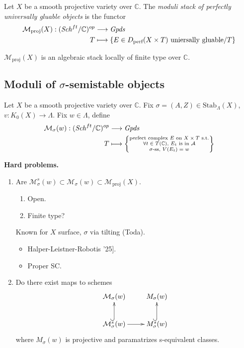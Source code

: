 \begin{definition}
\label{definition-moduli-stack-of-perfectly-univerasally-gluable-objects}
Let $X$ be a smooth projective variety over $\mathbb{C}$. The {\it moduli stack
of perfectly universally gluable objects} is the functor
\begin{align*}
\mathcal{M}_{\text{proj}}(X): (\mathit{Sch}^{ft}/\mathbb{C})^{op} 
&\longrightarrow \mathit{Gpds} \\
T &\longmapsto  \{E \in D_{\text{perf}}(X\times T)\text{ uniersally gluable}/T\}
\end{align*}

\end{definition}

\begin{theorem}[Lieblich]
\label{theorem-Lieblich}
$\mathcal{M}_{\text{proj}}(X)$ is an algebraic stack locally of finite type over
$\mathbb{C}$.
\end{theorem}

\subsection{Moduli of $\sigma$-semistable objects}
\label{subsection-moduli-of-sigma-semistable-objects}

Let $X$ be a smooth projective variety over $\mathbb{C}$. Fix
$\sigma=(A,Z)\in\text{Stab}_{\Lambda}(X)$, $v:K_0(X) \to \Lambda$. Fix $w \in
\Lambda$, define 
\begin{align*}
\mathcal{M}_{\sigma}(w):(\mathit{Sch}^{ft}/\mathbb{C})^{op} 
 &\longrightarrow  \mathit{Gpds} \\
T &\longmapsto \left\{ \substack{\text{perfect complex $E$ on $X\times T$ s.t.} 
\\ \text{$\forall t \in T(\mathbb{C})$, $E_t$ is in $\mathcal{A}$}\\
\text{$\sigma$-ss, $V(E_t)=w$}} \right\} 
\end{align*}

\medskip\noindent
{\bf Hard problems.}
\begin{enumerate}
\item Are $\mathcal{M}_{\sigma}^s(w) \subset \mathcal{M}_{\sigma}(w)
\subset \mathcal{M}_{\text{proj}}(X)$.
\begin{enumerate}
\item Open.
\item Finite type?
\end{enumerate}
Known for $X$ surface, $\sigma$ via tilting (Toda). 
\begin{itemize}
\item \text{[}Halper-Leistner-Robotis '25].
\item Proper SC.
\end{itemize}
\item Do there exist maps to schemes
$$
\xymatrix{
\mathcal{M}_{\sigma}(w)&M_\sigma(w)\\
\mathcal{M}_{\sigma}^s(w)\ar[r]\ar@{^{(}->}[u]& M_{\sigma}^s(w)\ar@{^{(}->}[u] 
}
$$
where $M_\sigma(w)$ is projective and paramatrizes s-equivalent classes.
\end{enumerate}

